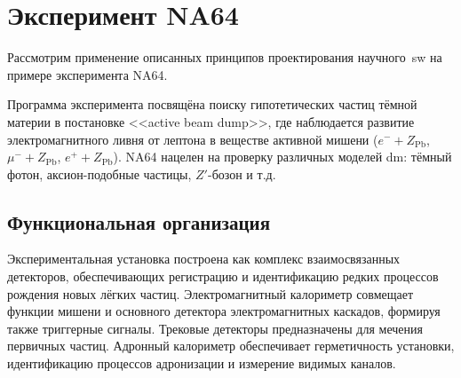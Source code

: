 \chapter{Эксперимент NA64}

Рассмотрим применение описанных принципов проектирования
научного~\acrshort{sw} на примере эксперимента NA64.

Программа эксперимента посвящёна поиску гипотетических частиц тёмной материи в
постановке <<active beam dump>>, где
наблюдается развитие электромагнитного ливня от лептона в веществе активной мишени
($e^{-} + Z_{\text{Pb}}$, $\mu^{-} + Z_{\text{Pb}}$, $e^{+} + Z_{\text{Pb}}$).
NA64 нацелен на проверку различных моделей \acrshort{dm}: тёмный фотон, аксион-подобные частицы, $Z'$-бозон и т.д.










\section{Функциональная организация}

Экспериментальная установка построена как комплекс
взаимосвязанных детекторов, обеспечивающих
регистрацию и идентификацию редких процессов рождения
новых лёгких частиц. Электромагнитный калориметр
совмещает функции мишени и основного детектора электромагнитных
каскадов, формируя также триггерные сигналы. Трековые
детекторы предназначены для мечения первичных частиц. Адронный
калориметр обеспечивает герметичность установки, идентификацию
процессов адронизации и измерение видимых каналов.

